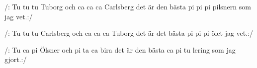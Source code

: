	
\beginverse*						
/: Tu tu tu Tuborg 
och ca ca ca Carlsberg 
det är den bästa 
pi pi pi pilsnern som jag vet.:/ 
\endverse						

\beginverse				
/: Tu tu tu Carlsberg 
och ca ca ca Tuborg 
det är det bästa 
pi pi pi ölet jag vet.:/
\endverse

\beginverse
/: Tu ca pi Ölsner och 
pi ta ca bira 
det är den bästa 
ca pi tu lering som jag gjort.:/
\endverse
\endsong		
